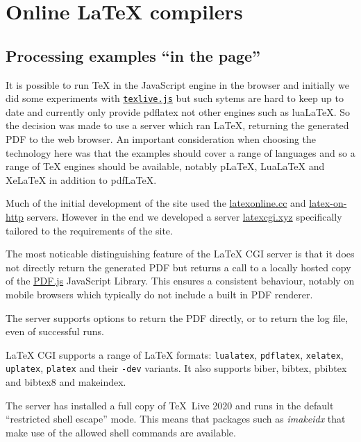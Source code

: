 \documentclass[harvardcite]{ltugboat}
\begin{document}
\section{Online \LaTeX{} compilers}


\subsection{Processing examples ``in the page''}

It is possible to run \TeX{} in the JavaScript engine in the browser and
initially we did some experiments with
\href{https://github.com/manuels/texlive.js/}{\texttt{texlive.js}} but
such sytems are hard to keep up to date and currently only provide
pdflatex not other engines such as lua\LaTeX{}. So the decision was
made to use a server which ran \LaTeX{}, returning the generated PDF
to the web browser.  An important consideration when choosing the
technology here was that the examples should cover a range of
languages and so a range of \TeX{} engines should be available,
notably p\LaTeX{}, Lua\LaTeX{} and Xe\LaTeX{} in addition to
pdf\LaTeX.

Much of the initial development of the site used the
\href{https://latexonline.cc}{latexonline.cc}
and
\href{https://latex.ytotech.com/}{latex-on-http}
servers. However in
the end we developed a server
\href{https://latexcgi.xyz}{latexcgi.xyz}
specifically tailored to the
requirements of the site.

The most noticable distinguishing feature of the \LaTeX{} CGI server
is that it does not directly return the generated PDF but returns a
call to a locally hosted copy of the
\href{https://mozilla.github.io/pdf.js/}{PDF.js}
JavaScript Library. This ensures a consistent behaviour, notably on
mobile browsers which typically do not include a built in PDF
renderer.

The server supports options to return the PDF directly, or to return
the log file, even of successful runs.

\LaTeX{} CGI supports a range of \LaTeX{} formats:
\texttt{lualatex}, \texttt{pdflatex}, \texttt{xelatex},
\texttt{uplatex}, \texttt{platex} and their \texttt{-dev} variants. It also
supports biber, bibtex, pbibtex and bibtex8 and makeindex.

The server has installed a full copy of \TeX\ Live 2020 and runs in
the default ``restricted shell escape'' mode. This means that packages
 such as \textit{imakeidx} that make use of the allowed shell commands
are available.
\end{document}
